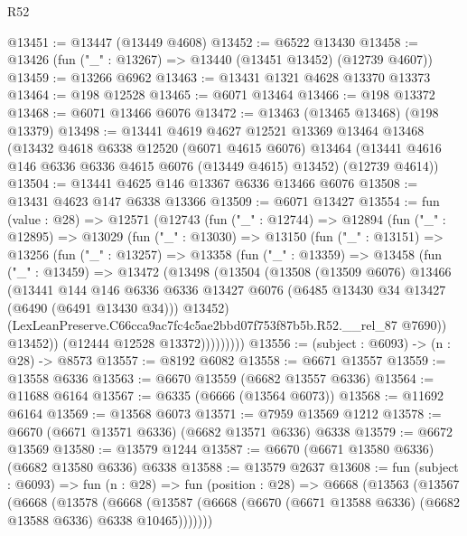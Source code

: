 \begin{lexlean}{R52}
\begin{coremodule}
@13451 := @13447 (@13449 @4608)
@13452 := @6522 @13430
@13458 := @13426 (fun ("_" : @13267) => @13440 (@13451 @13452) (@12739 @4607))
@13459 := @13266 @6962
@13463 := @13431 @1321 @4628 @13370 @13373
@13464 := @198 @12528
@13465 := @6071 @13464
@13466 := @198 @13372
@13468 := @6071 @13466 @6076
@13472 := @13463 (@13465 @13468) (@198 @13379)
@13498 := @13441
    @4619
    @4627
    @12521
    @13369
    @13464
    @13468
    (@13432
      @4618
      @6338
      @12520
      (@6071 @4615 @6076)
      @13464
      (@13441 @4616 @146 @6336 @6336 @4615 @6076 (@13449 @4615) @13452)
      (@12739 @4614))
@13504 := @13441 @4625 @146 @13367 @6336 @13466 @6076
@13508 := @13431 @4623 @147 @6338 @13366
@13509 := @6071 @13427
@13554 := fun (value : @28) =>
  @12571
    (@12743
      (fun ("_" : @12744) =>
      @12894
        (fun ("_" : @12895) =>
        @13029
          (fun ("_" : @13030) =>
          @13150
            (fun ("_" : @13151) =>
            @13256
              (fun ("_" : @13257) =>
              @13358
                (fun ("_" : @13359) =>
                @13458
                  (fun ("_" : @13459) =>
                  @13472
                    (@13498
                      (@13504
                        (@13508
                          (@13509 @6076)
                          @13466
                          (@13441
                            @144
                            @146
                            @6336
                            @6336
                            @13427
                            @6076
                            (@6485 @13430 @34 @13427 (@6490 (@6491 @13430 @34)))
                            @13452)
                          (LexLeanPreserve.C66cca9ac7fc4c5ae2bbd07f753f87b5b.R52.__rel_87 @7690))
                        @13452))
                    (@12444 @12528 @13372)))))))))
@13556 := (subject : @6093) -> (n : @28) -> @8573
@13557 := @8192 @6082
@13558 := @6671 @13557
@13559 := @13558 @6336
@13563 := @6670 @13559 (@6682 @13557 @6336)
@13564 := @11688 @6164
@13567 := @6335 (@6666 (@13564 @6073))
@13568 := @11692 @6164
@13569 := @13568 @6073
@13571 := @7959 @13569 @1212
@13578 := @6670 (@6671 @13571 @6336) (@6682 @13571 @6336) @6338
@13579 := @6672 @13569
@13580 := @13579 @1244
@13587 := @6670 (@6671 @13580 @6336) (@6682 @13580 @6336) @6338
@13588 := @13579 @2637
@13608 := fun (subject : @6093) =>
  fun (n : @28) =>
  fun (position : @28) =>
  @6668
    (@13563
      (@13567
        (@6668
          (@13578
            (@6668
              (@13587 (@6668 (@6670 (@6671 @13588 @6336) (@6682 @13588 @6336) @6338 @10465)))))))

\end{coremodule}
\end{lexlean}
